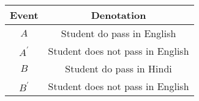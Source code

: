 \begin{tabular}[12pt]{ |c| c|} 
    \hline
    {Event} & {Denotation}\\ 
    \hline
    $A $ &  Student do pass in English \\
    \hline 
    $ A^\prime $ & Student does not pass in English\\
    \hline
    $ B $ & Student do pass in Hindi\\
    \hline   
    $ B^\prime $ & Student does not pass in English\\
    \hline
\end{tabular}
